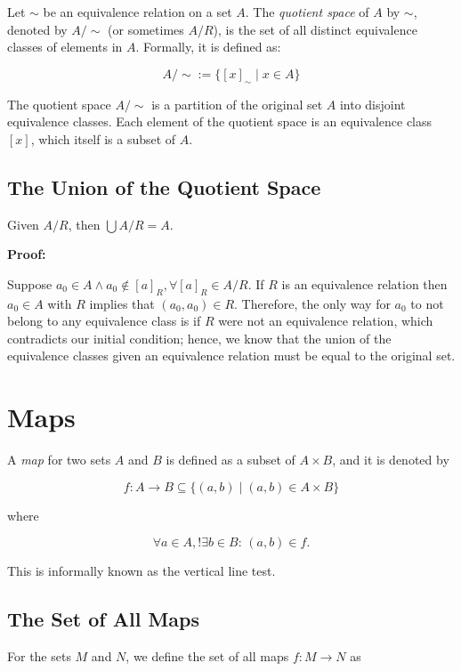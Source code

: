 Let \(\sim\) be an equivalence relation on a set \(A\). The \emph{quotient space} of \(A\) by 
\(\sim\), denoted by \(A / \sim\) (or sometimes \(A / R\)), is the set of all distinct equivalence classes of 
elements in \(A\). Formally, it is defined as:

\[
	A / \sim := \{[x]_\sim \mid x \in A\}
\]

The quotient space \(A/\sim\) is a partition of the original set \(A\) into disjoint equivalence classes. 
Each element of the quotient space is an equivalence class \([x]\), which itself is a subset of \(A\).

\subsection{The Union of the Quotient Space}

Given \(A/R\), then \(\bigcup A/R = A\).

\textbf{Proof:}

Suppose \(a_0 \in A \land a_0 \notin [a]_R, \forall [a]_R \in A/R\). If \(R\) is an equivalence relation then 
\( a_0 \in A\) with \(R\) implies that \((a_0, a_0) \in R\). Therefore, the only way for \(a_0\) to not belong to any equivalence class is if \(R\)
were not an equivalence relation, which contradicts our initial condition; hence, we know that the union of the equivalence classes 
given an equivalence relation must be equal to the original set.

\QED

\section{Maps}

A \emph{map} for two sets \(A\) and \(B\) is defined as a subset of \(A \times B\), and it is denoted by 

\[
	f: A \to B \subseteq \{(a, b) \mid (a,b) \in A \times B\}
\]

where 

\[
	\forall a \in A, !\exists b \in B: \, (a, b) \in f.
\]

This is informally known as the vertical line test.

\subsection{The Set of All Maps}

For the sets \(M\) and \(N\), we define the set of all maps \(f: M \to N\) as 

